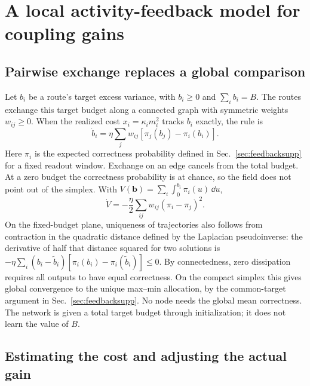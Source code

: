 \section{A local activity-feedback model for coupling gains}
\label{sec:localgainsupp}

\subsection{Pairwise exchange replaces a global comparison}

Let \(b_i\) be a route's target excess variance, with \(b_i\geq0\)
and \(\sum_i b_i=B\). The routes exchange this target budget along
a connected graph with symmetric weights \(w_{ij}\geq0\). When
the realized cost \(x_i=\kappa_i m_i^2\) tracks \(b_i\) exactly,
the rule is
\begin{equation}
  \dot b_i=\eta\sum_j w_{ij}[\pi_j(b_j)-\pi_i(b_i)].
  \label{eq:edgefeedback}
\end{equation}
Here \(\pi_i\) is the expected correctness probability defined in
Sec.~\ref{sec:feedbacksupp} for a fixed readout window. Exchange
on an edge cancels from the total budget. At a zero budget the
correctness probability is at chance, so the field does not point
out of the simplex. With \(V(\boldsymbol b)=\sum_i\int_0^{b_i}
\pi_i(u)\,\dd u\),
\begin{equation}
 \dot V=-\frac{\eta}{2}\sum_{ij} w_{ij}(\pi_i-\pi_j)^2.
\end{equation}
On the fixed-budget plane, uniqueness of trajectories also follows
from contraction in the quadratic distance defined by the Laplacian
pseudoinverse: the derivative of half that distance squared for two
solutions is \(-\eta\sum_i(b_i-\widetilde b_i)
[\pi_i(b_i)-\pi_i(\widetilde b_i)]\leq0\). By connectedness,
zero dissipation requires all outputs to have equal correctness.
On the compact simplex this gives global convergence to the unique
max--min allocation, by the common-target argument in
Sec.~\ref{sec:feedbacksupp}. No node needs the global mean correctness.
The network is given a total target budget through initialization;
it does not learn the value of \(B\).

\subsection{Estimating the cost and adjusting the actual gain}

